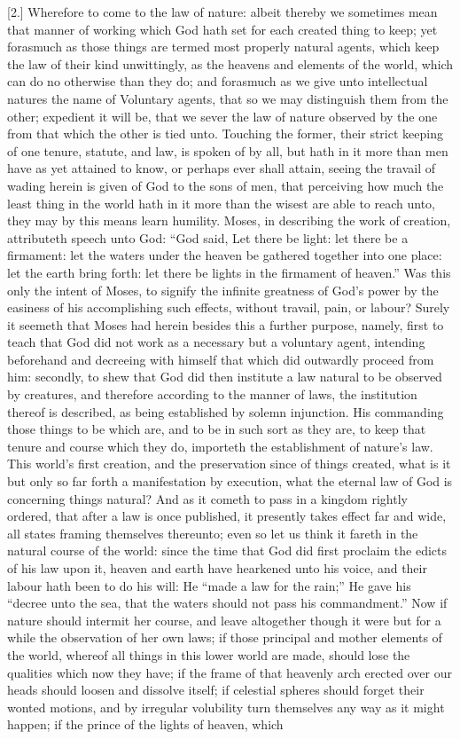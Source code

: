 [2.] Wherefore to come to the law of nature: albeit thereby we sometimes mean that manner of working which God hath set for each created thing to keep; yet forasmuch as those things are termed most properly natural agents, which keep the law of their kind unwittingly, as the heavens and elements of the world, which can do no otherwise than they do; and forasmuch as we give unto intellectual natures the name of Voluntary agents, that so we may distinguish them from the other; expedient it will be, that we sever the law of nature observed by the one from that which the other is tied unto. Touching the former, their strict keeping of one tenure, statute, and law, is spoken of by all, but hath in it more than men have as yet attained to know, or perhaps ever shall attain, seeing the travail of wading herein is given of God to the sons of men, that perceiving how much the least thing in the world hath in it more than the wisest are able to reach unto, they may by this means learn humility. Moses, in describing the work of creation, attributeth speech unto God: “God said, Let there be light: let there be a firmament: let the waters under the heaven be gathered together into one place: let the earth bring forth: let there be lights in the firmament of heaven.” Was this only the intent of Moses, to signify the infinite greatness of God’s power by the easiness of his accomplishing such effects, without travail, pain, or labour? Surely it seemeth that Moses had herein besides this a further purpose, namely, first to teach that God did not work as a  necessary but a voluntary agent, intending beforehand and decreeing with himself that which did outwardly proceed from him: secondly, to shew that God did then institute a law natural to be observed by creatures, and therefore according to the manner of laws, the institution thereof is described, as being established by solemn injunction. His commanding those things to be which are, and to be in such sort as they are, to keep that tenure and course which they do, importeth the establishment of nature’s law. This world’s first creation, and the preservation since of things created, what is it but only so far forth a manifestation by execution, what the eternal law of God is concerning things natural? And as it cometh to pass in a kingdom rightly ordered, that after a law is once published, it presently takes effect far and wide, all states framing themselves thereunto; even so let us think it fareth in the natural course of the world: since the time that God did first proclaim the edicts of his law upon it, heaven and earth have hearkened unto his voice, and their labour hath been to do his will: He “made a law for the rain;” He gave his “decree unto the sea, that the waters should not pass his commandment.” Now if nature should intermit her course, and leave altogether though it were but for a while the observation of her own laws; if those principal and mother elements of the world, whereof all things in this lower world are made, should lose the qualities which now they have; if the frame of that heavenly arch erected over our heads should loosen and dissolve itself; if celestial spheres should forget their wonted motions, and by irregular volubility turn themselves any way as it might happen; if the prince of the lights of heaven, which 